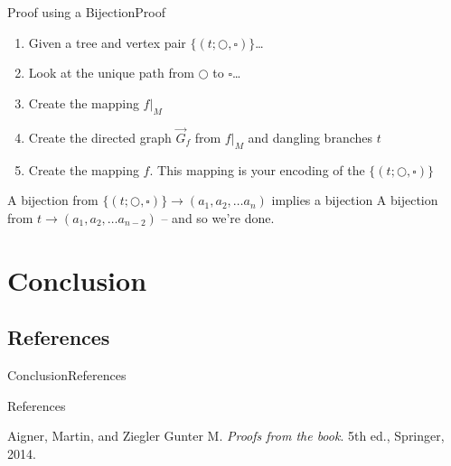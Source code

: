 \documentclass[10pt]{beamer}
\theoremstyle{definition}
\newcommand{\Sthree}{Proof using a Bijection}
\newcommand{\SthreeSSproof}{Proof}
\newcommand{\Sfour}{Conclusion}
\newcommand{\SfourSSreference}{References}
\begin{document}
\begin{frame}{\Sthree}{\SthreeSSproof}
\begin{enumerate}
  \item Given a tree and vertex pair $\{(t; \bigcirc, \square)\}$\ldots
  \pause{}
  \item Look at the unique path from $\bigcirc$ to $\square$\ldots
  \pause{}
  \item Create the mapping $f|_{M}$
  \pause{}
  \item Create the directed graph $\vec G_{f}$ from $f|_{M}$ and dangling branches $t$
  \pause{}
  \item Create the mapping $f$. This mapping is your encoding of the $\{(t; \bigcirc, \square)\}$
\end{enumerate}

\pause{}

A bijection from $\{(t; \bigcirc, \square)\} \rightarrow (a_{1},a_{2},\ldots a_{n})$ implies a bijection A bijection from $t \rightarrow (a_{1},a_{2},\ldots a_{n-2})$ -- and so we're done.

\end{frame}

\section{\Sfour}
\subsection{\SfourSSreference}
\begin{frame}{\Sfour}{\SfourSSreference}
\begin{block}{\SfourSSreference}
\begin{thebibliography}{9}
Aigner, Martin, and Ziegler Gunter M.
\textit{Proofs from the book}.
5th ed., Springer, 2014.
\end{thebibliography}
\end{block}

\end{frame}

\end{document}
